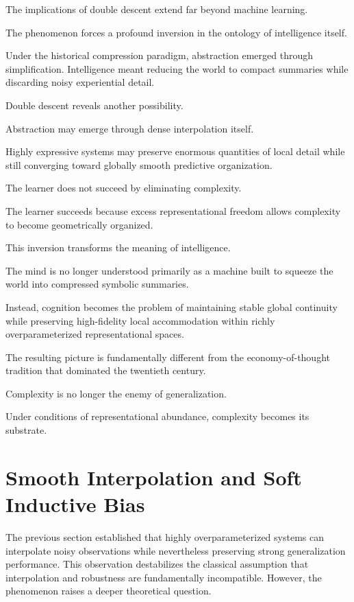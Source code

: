 \documentclass[12pt,a4paper]{article}
\begin{document}
The implications of double descent extend far beyond machine learning.

The phenomenon forces a profound inversion in the ontology of intelligence itself.

Under the historical compression paradigm, abstraction emerged through simplification. Intelligence meant reducing the world to compact summaries while discarding noisy experiential detail.

Double descent reveals another possibility.

Abstraction may emerge through dense interpolation itself.

Highly expressive systems may preserve enormous quantities of local detail while still converging toward globally smooth predictive organization.

The learner does not succeed by eliminating complexity.

The learner succeeds because excess representational freedom allows complexity to become geometrically organized.

This inversion transforms the meaning of intelligence.

The mind is no longer understood primarily as a machine built to squeeze the world into compressed symbolic summaries.

Instead, cognition becomes the problem of maintaining stable global continuity while preserving high-fidelity local accommodation within richly overparameterized representational spaces.

The resulting picture is fundamentally different from the economy-of-thought tradition that dominated the twentieth century.

Complexity is no longer the enemy of generalization.

Under conditions of representational abundance, complexity becomes its substrate.


\section{Smooth Interpolation and Soft Inductive Bias}

The previous section established that highly overparameterized systems can interpolate noisy observations while nevertheless preserving strong generalization performance. This observation destabilizes the classical assumption that interpolation and robustness are fundamentally incompatible. However, the phenomenon raises a deeper theoretical question.
\end{document}
